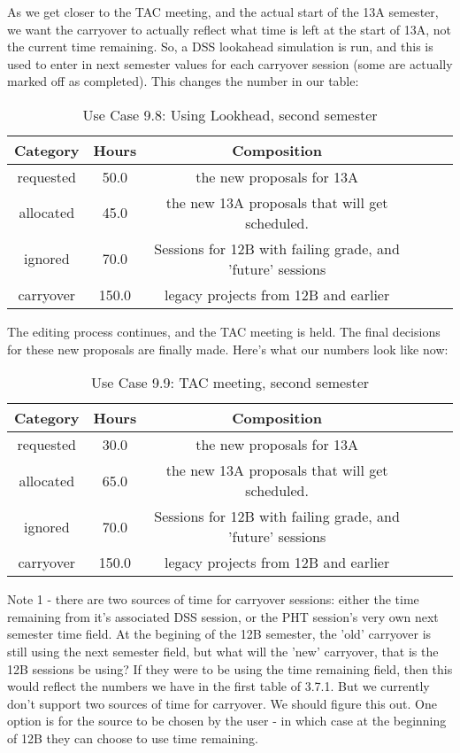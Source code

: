 \documentclass{article}
\begin{document}
As we get closer to the TAC meeting, and the actual start of the 13A semester, we want the carryover to actually reflect what time is left at the start of 13A, not the current time remaining. So, a DSS lookahead simulation is run, and this is used to enter in next semester values for each carryover session (some are actually marked off as completed). This changes the number in our table:

\begin{table}
{\footnotesize
\caption{Use Case 9.8: Using Lookhead, second semester\label{tab:time}}
\begin{tabular*}{1.05\textwidth}{@{\extracolsep{\fill}}cccccc}
\hline \hline
{\bf Category} & {\bf Hours} & {\bf Composition}\\
\hline
requested & 50.0 & the new proposals for 13A\\
allocated & 45.0 & the new 13A proposals that will get scheduled.\\
ignored & 70.0 & Sessions for 12B with failing grade, and 'future' sessions\\
carryover & 150.0 & legacy projects from 12B and earlier\\
\hline \hline
\end{tabular*}
}
\end{table}

The editing process continues, and the TAC meeting is held. The final decisions for these new proposals are finally made. Here's what our numbers look like now:

\begin{table}
{\footnotesize
\caption{Use Case 9.9: TAC meeting, second semester\label{tab:time}}
\begin{tabular*}{1.05\textwidth}{@{\extracolsep{\fill}}cccccc}
\hline \hline
{\bf Category} & {\bf Hours} & {\bf Composition}\\
\hline
requested & 30.0 & the new proposals for 13A\\
allocated & 65.0 & the new 13A proposals that will get scheduled.\\
ignored & 70.0 & Sessions for 12B with failing grade, and 'future' sessions\\
carryover & 150.0 & legacy projects from 12B and earlier\\
\hline \hline
\end{tabular*}
}
\end{table}

    Note 1 - there are two sources of time for carryover sessions: either the time remaining from it's associated DSS session, or the PHT session's very own next semester time field. At the begining of the 12B semester, the 'old' carryover is still using the next semester field, but what will the 'new' carryover, that is the 12B sessions be using? If they were to be using the time remaining field, then this would reflect the numbers we have in the first table of 3.7.1. But we currently don't support two sources of time for carryover. We should figure this out. One option is for the source to be chosen by the user - in which case at the beginning of 12B they can choose to use time remaining. 
\end{document}
